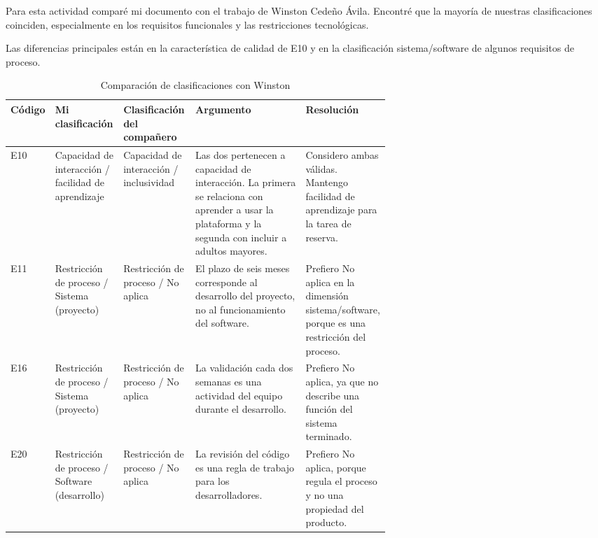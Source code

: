 \documentclass[conference,onecolumn]{IEEEtran}
\begin{document}
Para esta actividad comparé mi documento con el trabajo de
Winston Cedeño Ávila. Encontré que la mayoría de nuestras
clasificaciones coinciden, especialmente en los requisitos
funcionales y las restricciones tecnológicas.

Las diferencias principales están en la característica de
calidad de E10 y en la clasificación sistema/software de
algunos requisitos de proceso.

\begin{table}[H]
\caption{Comparación de clasificaciones con Winston}
\label{tab:discrepancias}
\centering
\footnotesize
\renewcommand{\arraystretch}{1.3}
\begin{tabularx}{\linewidth}{
@{}p{0.07\linewidth}
p{0.18\linewidth}
p{0.19\linewidth}
Y
p{0.19\linewidth}@{}}
\toprule
\textbf{Código} &
\textbf{Mi clasificación} &
\textbf{Clasificación del compañero} &
\textbf{Argumento} &
\textbf{Resolución} \\
\midrule

E10 &
Capacidad de interacción / facilidad de aprendizaje &
Capacidad de interacción / inclusividad &
Las dos pertenecen a capacidad de interacción.
La primera se relaciona con aprender a usar la plataforma
y la segunda con incluir a adultos mayores. &
Considero ambas válidas. Mantengo facilidad de aprendizaje
para la tarea de reserva. \\

E11 &
Restricción de proceso / Sistema (proyecto) &
Restricción de proceso / No aplica &
El plazo de seis meses corresponde al desarrollo del proyecto,
no al funcionamiento del software. &
Prefiero No aplica en la dimensión sistema/software,
porque es una restricción del proceso. \\

E16 &
Restricción de proceso / Sistema (proyecto) &
Restricción de proceso / No aplica &
La validación cada dos semanas es una actividad del equipo
durante el desarrollo. &
Prefiero No aplica, ya que no describe una función
del sistema terminado. \\

E20 &
Restricción de proceso / Software (desarrollo) &
Restricción de proceso / No aplica &
La revisión del código es una regla de trabajo
para los desarrolladores. &
Prefiero No aplica, porque regula el proceso
y no una propiedad del producto. \\

\bottomrule
\end{tabularx}
\end{table}
\end{document}
